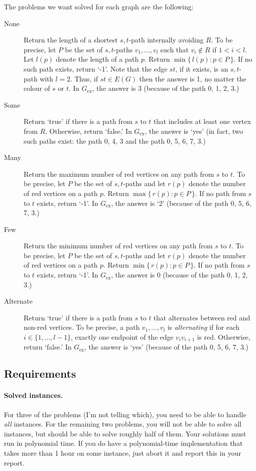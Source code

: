\documentclass{tufte-handout}
\begin{document}
The problems we want solved for each graph are the following:
\begin{description}
  \item[None] Return the length of a shortest $s,t$-path internally avoiding $R$.
    To be precise, let $P$ be the set of $s,t$-paths $v_1,\ldots, v_l$ such that $v_i\notin R$ if $1<i<l$.
    Let $l(p)$ denote the length of a path $p$.
    Return $\min\{\,l(p)\colon p\in P\,\}$.
    If no such path exists, return `-1'.
    Note that the edge $st$, if it exists, is an $s,t$-path with $l=2$.
    Thus, if $st\in E(G)$ then the answer is 1, no matter the colour of $s$ or $t$.
    In $G_{\text{ex}}$, the answer is 3 (because of the path 0, 1, 2, 3.)
  \item[Some] Return `true' if there is a path from $s$ to $t$ that includes at least one vertex from $R$.
    Otherwise, return `false.'
    In $G_{\text{ex}}$, the answer is `yes' (in fact, two such paths exist: the path 0, 4, 3 and the path 0, 5, 6, 7, 3.)
  \item [Many] Return the maximum number of red vertices on any path from $s$ to $t$.
    To be precise, let $P$ be the set of $s,t$-paths and let $r(p)$ denote the number of red vertices  on a path $p$.
    Return $\max\{\,r(p)\colon p\in P\,\}$.
    If no path from $s$ to $t$ exists, return `-1'.
    In $G_{\text{ex}}$, the answer is `2' (because of the path 0, 5, 6, 7, 3.)
  \item [Few] Return the minimum number of red vertices on any path from $s$ to $t$.
    To be precise, let $P$ be the set of $s,t$-paths and let $r(p)$ denote the number of red vertices  on a path $p$.
    Return $\min\{\,r(p)\colon p\in P\,\}$.
    If no path from $s$ to $t$ exists, return `-1'.
    In $G_{\text{ex}}$, the answer is 0 (because of the path 0, 1, 2, 3.)
  \item [Alternate] Return `true' if there is a path from $s$ to $t$ that alternates between red and non-red vertices.
    To be precise, a path $v_1,\ldots, v_l$ is \emph{alternating} if for each $i\in\{1,\ldots,l-1\}$, exactly one endpoint of the edge $v_iv_{i+1}$ is red.
    Otherwise, return `false.'
    In $G_{\text{ex}}$, the answer is `yes' (because of the path 0, 5, 6, 7, 3.)
\end{description}

\subsection{Requirements}
\paragraph{Solved instances.}
For three of the problems (I’m not telling which), you need to be able to handle \emph{all} instances.
For the remaining two problems, you will not be able to solve all instances, but should be able to solve roughly half of them.
Your solutions must run in polynomial time. 
If you do have a polynomial-time implementation that takes more than 1 hour on some instance, just abort it and report this in your report.
\end{document}
